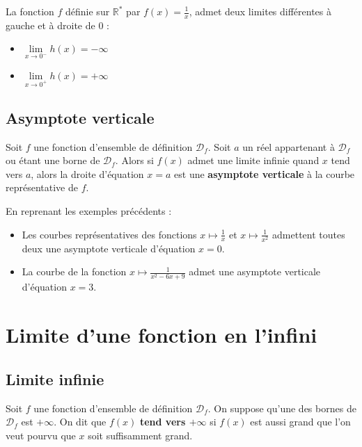 	\begin{tip}[Exemple]
		La fonction $f$ définie sur $\mathbb{R}^*$ par $f(x) = \frac{1}{x}$, admet deux limites différentes à gauche et à droite de $0$ :
		\begin{itemize}
			\item $\lim\limits_{x \rightarrow 0^-} h(x) = -\infty$
			\item $\lim\limits_{x \rightarrow 0^+} h(x) = +\infty$
		\end{itemize}
	\end{tip}

	\subsection{Asymptote verticale}

	\begin{formula}[Définition]
		Soit $f$ une fonction d'ensemble de définition $\mathcal{D}_f$. Soit $a$ un réel appartenant à $\mathcal{D}_f$ ou étant une borne de $\mathcal{D}_f$.
		\newpar
		Alors si $f(x)$ admet une limite infinie quand $x$ tend vers $a$, alors la droite d'équation $x = a$ est une \textbf{asymptote verticale} à la courbe représentative de $f$.
	\end{formula}

	\begin{tip}[Exemple]
		En reprenant les exemples précédents :
		\begin{itemize}
			\item Les courbes représentatives des fonctions $x \mapsto \frac{1}{x}$ et $x \mapsto \frac{1}{x^2}$ admettent toutes deux une asymptote verticale d'équation $x = 0$.
			\item La courbe de la fonction $x \mapsto \frac{1}{x^2-6x+9}$ admet une asymptote verticale d'équation $x = 3$.
		\end{itemize}
	\end{tip}

	\section{Limite d'une fonction en l'infini}

	\subsection{Limite infinie}

	\begin{formula}
		Soit $f$ une fonction d'ensemble de définition $\mathcal{D}_f$. On suppose qu'une des bornes de $\mathcal{D}_f$ est $+\infty$.
		\newpar
		On dit que $f(x)$ \textbf{tend vers $+\infty$} si $f(x)$ est aussi grand que l'on veut pourvu que $x$ soit suffisamment grand.
	\end{formula}

